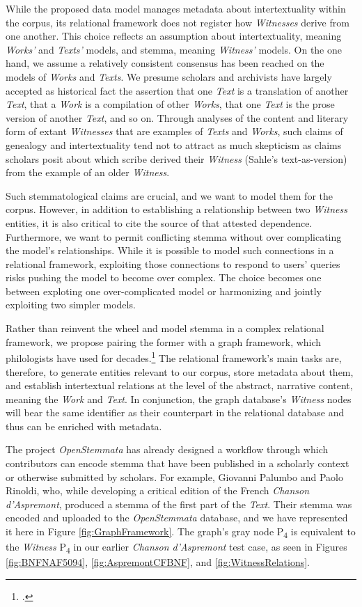 While the proposed data model manages metadata about intertextuality within the corpus, its relational framework does not register how \textit{Witnesses} derive from one another. This choice reflects an assumption about intertextuality, meaning \textit{Works'} and \textit{Texts'} models, and stemma, meaning \textit{Witness'} models. On the one hand, we assume a relatively consistent consensus has been reached on the models of \textit{Works} and \textit{Texts}. We presume scholars and archivists have largely accepted as historical fact the assertion that one \textit{Text} is a translation of another \textit{Text}, that a \textit{Work} is a compilation of other \textit{Works}, that one \textit{Text} is the prose version of another \textit{Text}, and so on. Through analyses of the content and literary form of extant \textit{Witnesses} that are examples of \textit{Texts} and \textit{Works}, such claims of genealogy and intertextuality tend not to attract as much skepticism as claims scholars posit about which scribe derived their \textit{Witness} (Sahle's text-as-version) from the example of an older \textit{Witness}.

Such stemmatological claims are crucial, and we want to model them for the corpus. However, in addition to establishing a relationship between two \textit{Witness} entities, it is also critical to cite the source of that attested dependence. Furthermore, we want to permit conflicting stemma without over complicating the model's relationships. While it is possible to model such connections in a relational framework, exploiting those connections to respond to users' queries risks pushing the model to become over complex. The choice becomes one between exploting one over-complicated model or harmonizing and jointly exploiting two simpler models.

Rather than reinvent the wheel and model stemma in a complex relational framework, we propose pairing the former with a graph framework, which philologists have used for decades.\footcite[][]{Zundert2020} The relational framework's main tasks are, therefore, to generate entities relevant to our corpus, store metadata about them, and establish intertextual relations at the level of the abstract, narrative content, meaning the \textit{Work} and \textit{Text}. In conjunction, the graph database's \textit{Witness} nodes will bear the same identifier as their counterpart in the relational database and thus can be enriched with metadata.

The project \textit{OpenStemmata} has already designed a workflow through which contributors can encode stemma that have been published in a scholarly context or otherwise submitted by scholars. For example, Giovanni Palumbo and Paolo Rinoldi, who, while developing a critical edition of the French \textit{Chanson d'Aspremont}, produced a stemma of the first part of the \textit{Text}. Their stemma was encoded and uploaded to the \textit{OpenStemmata} database, and we have represented it here in Figure \ref{fig:GraphFramework}. The graph's gray node P\textsubscript{4} is equivalent to the \textit{Witness} P\textsubscript{4} in our earlier \textit{Chanson d'Aspremont} test case, as seen in Figures \ref{fig:BNFNAF5094}, \ref{fig:AspremontCFBNF}, and \ref{fig:WitnessRelations}.

